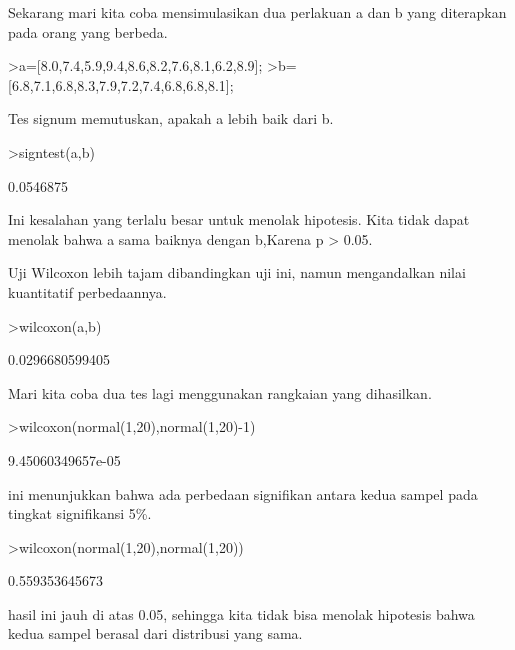 \documentclass[a4paper,10pt]{article}
\begin{document}
\begin{eulernotebook}
\begin{eulercomment}
\begin{eulercomment}
\begin{eulercomment}
\begin{eulercomment}
\begin{eulercomment}
Sekarang mari kita coba mensimulasikan dua perlakuan a dan b yang
diterapkan pada orang yang berbeda.
\end{eulercomment}
\begin{eulerprompt}
>a=[8.0,7.4,5.9,9.4,8.6,8.2,7.6,8.1,6.2,8.9];
>b=[6.8,7.1,6.8,8.3,7.9,7.2,7.4,6.8,6.8,8.1];
\end{eulerprompt}
\begin{eulercomment}
Tes signum memutuskan, apakah a lebih baik dari b.
\end{eulercomment}
\begin{eulerprompt}
>signtest(a,b)
\end{eulerprompt}
\begin{euleroutput}
  0.0546875
\end{euleroutput}
\begin{eulercomment}
Ini kesalahan yang terlalu besar untuk menolak hipotesis. Kita tidak
dapat menolak bahwa a sama baiknya dengan b,Karena p \textgreater{} 0.05.

Uji Wilcoxon lebih tajam dibandingkan uji ini, namun mengandalkan
nilai kuantitatif perbedaannya.
\end{eulercomment}
\begin{eulerprompt}
>wilcoxon(a,b)
\end{eulerprompt}
\begin{euleroutput}
  0.0296680599405
\end{euleroutput}
\begin{eulercomment}
Mari kita coba dua tes lagi menggunakan rangkaian yang dihasilkan.
\end{eulercomment}
\begin{eulerprompt}
>wilcoxon(normal(1,20),normal(1,20)-1)
\end{eulerprompt}
\begin{euleroutput}
  9.45060349657e-05
\end{euleroutput}
\begin{eulercomment}
ini menunjukkan bahwa ada perbedaan signifikan antara kedua sampel
pada tingkat signifikansi 5\%.
\end{eulercomment}
\begin{eulerprompt}
>wilcoxon(normal(1,20),normal(1,20))
\end{eulerprompt}
\begin{euleroutput}
  0.559353645673
\end{euleroutput}
\begin{eulercomment}
hasil ini  jauh di atas 0.05, sehingga kita tidak bisa menolak
hipotesis bahwa kedua sampel berasal dari distribusi yang sama.


\end{eulercomment}
\end{eulercomment}
\end{eulercomment}
\end{eulercomment}
\end{eulercomment}
\end{eulernotebook}
\end{document}
